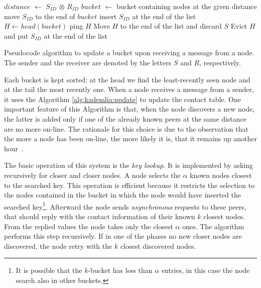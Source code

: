 \begin{algorithm}[t]
    \begin{algorithmic}
        \State $distance$ $\gets$ $S_{ID}$ $\otimes$ $R_{ID}$
        \State $bucket$ $\gets$ bucket containing nodes at the given distance
        \State move $S_{ID}$ to the end of $bucket$
        \Else
        \State insert $S_{ID}$ at the end of the list
        \Else
        \State $H \gets head(bucket)$
        \State ping $H$
        \State Move $H$ to the end of the list and discard $S$
        \Else
        \State Evict $H$ and put $S_{ID}$ at the end of the list
        \EndIf
        \EndIf
        \EndIf
    \end{algorithmic}
    \caption{Pseudocode algorithm to update a bucket upon receiving a message
    from a node. The sender and the receiver are denoted by the letters $S$ and
    $R$, respectively.}
    \label{alg:kademlia:update}
\end{algorithm}

Each bucket is kept sorted: at the head we find the least-recently seen node
and at the tail the most recently one.
When a node receives a message from a sender, it uses
the Algorithm \autoref{alg:kademlia:update} to update the contact table.
One important feature of this Algorithm is that, when the node discovers
a new node, the latter is added only if one of the already known peers at the
same distance are no more on-line. The rationale for this choice is due
to the observation that the more a node has been on-line, the more likely it is,
that it remains up another hour~\cite{bib:kademlia}.

The basic operation of this system is the \emph{key lookup}.
It is implemented by asking recursively for closer and closer nodes.
A node selects the $\alpha$ known nodes
closest to the searched key. This operation is efficient because
it restricts the selection to the nodes contained in the bucket in which the
node would have inserted the searched key\footnote{It is possible that the
    $k$-bucket
has less than $\alpha$ entries, in this case the node search also in other
buckets.}.
Afterward the node sends \emph{asynchronous} requests to these peers, that
should reply with the contact information of their known $k$ closest nodes.
From the replied values the node takes only the closest $\alpha$ ones.
The algorithm performs this step recursively.
If in one of the phases no new closer nodes are discovered, the node retry with
the $k$ closest discovered nodes.

